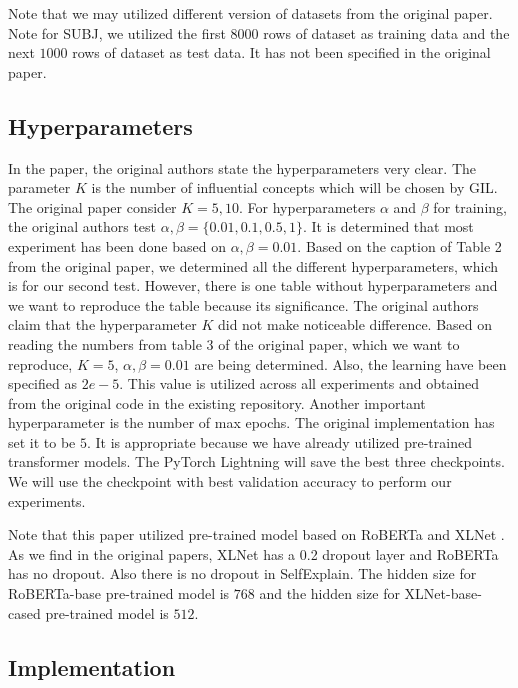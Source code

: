 \documentclass{article}
\begin{document}
Note that we may utilized different version of datasets from the original paper. Note for 
SUBJ, we utilized the first $8000$ rows of dataset as training data and the next $1000$ rows 
of dataset as test data. It has not been specified in the original paper.

\subsection{Hyperparameters}

In the paper, the original authors state the hyperparameters very clear. The parameter $K$
is the number of influential concepts which will be chosen by GIL. The original paper consider 
$K = 5, 10$. For hyperparameters $\alpha$ and $\beta$ for training, the original authors 
test $\alpha, \beta = \{0.01, 0.1, 0.5, 1\}$. It is determined that most experiment has 
been done based on $\alpha, \beta = 0.01$. Based on the caption of Table 2 from the original 
paper, we determined all the different hyperparameters, which is for our second test. However,
there is one table without hyperparameters and we want to reproduce the table because its 
significance. The original authors claim that the hyperparameter $K$ did not make noticeable 
difference. Based on reading the numbers from table 3 of the original paper, which we want 
to reproduce, $K = 5$, $\alpha, \beta = 0.01$ are being determined. Also, the learning 
have been specified as $2e-5$. This value is utilized across all experiments and obtained from 
the original code in the existing repository. Another important hyperparameter is the number of 
max epochs. The original implementation has set it to be $5$. It is appropriate because we have 
already utilized pre-trained transformer models. The PyTorch Lightning \cite{falcon2019pytorch} will 
save the best three checkpoints. We will use the checkpoint with best validation accuracy to perform 
our experiments.

Note that this paper utilized pre-trained model based on RoBERTa \cite{DBLP:journals/corr/abs-1907-11692} and XLNet 
\cite{DBLP:journals/corr/abs-1906-08237}. As we find in the original papers, XLNet has a 0.2 dropout 
layer and RoBERTa has no dropout. Also there is no dropout in SelfExplain. The hidden size for 
RoBERTa-base pre-trained model is $768$ and the hidden size for XLNet-base-cased pre-trained model is $512$.

\subsection{Implementation}
\end{document}
